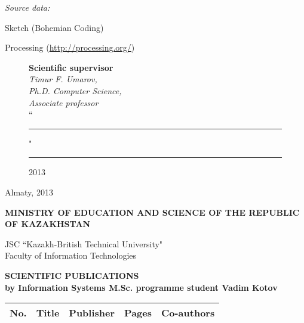 \begin{titlepage}
    \emph{Source data:}
    
    \begin{compactitem}
    \item Sketch (Bohemian Coding)
    \item Processing (\url{http://processing.org/})
    \end{compactitem}


    \begin{figure}[ht]
            \begin{minipage}[t]{0.6\linewidth}
                {\bf Scientific supervisor}\\

                {\em Timur F. Umarov,\\
                Ph.D. Computer Science,\\
                Associate professor}\\
                
                ``\rule{2em}{0.4pt}" \rule{8em}{0.4pt} 2013\\
         \end{minipage}
    \end{figure}
    
    \begin{center}
        \vfill
        Almaty, 2013
    \end{center}

    \pagebreak

    \begin{centering}
        {\bf{\MakeUppercase{Ministry of education and science of the republic of Kazakhstan}}

        \vspace{14pt}

        JSC ``Kazakh-British Technical University"\\
        Faculty of Information Technologies}

        \vspace{14pt}
        
        {\bf
        \MakeUppercase{Scientific publications}\\
        by Information Systems M.Sc. programme student Vadim Kotov
        }

        \vspace{14pt}
    \end{centering}

    \begin{centering}

        \begin{longtable}{|l|p{}|p{}|l|l|}
            \hline
            \textbf{No.} & \textbf{Title} & \textbf{Publisher} & \textbf{Pages} & \textbf{Co-authors}\\
            \endhead


\end{longtable}
\end{centering}
\end{titlepage}
